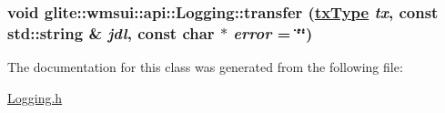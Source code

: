 \hypertarget{classglite_1_1wmsui_1_1api_1_1Logging_a6}{
\subsubsection[transfer]{\setlength{\rightskip}{0pt plus 5cm}void glite::wmsui::api::Logging::transfer (\hyperlink{classglite_1_1wmsui_1_1api_1_1Logging_w3}{tx\-Type} {\em tx}, const std::string \& {\em jdl}, const char $\ast$ {\em error} = \char`\"{}\char`\"{})}}
\label{classglite_1_1wmsui_1_1api_1_1Logging_a6}




The documentation for this class was generated from the following file:\begin{CompactItemize}
\item 
\hyperlink{Logging_8h}{Logging.h}\end{CompactItemize}

